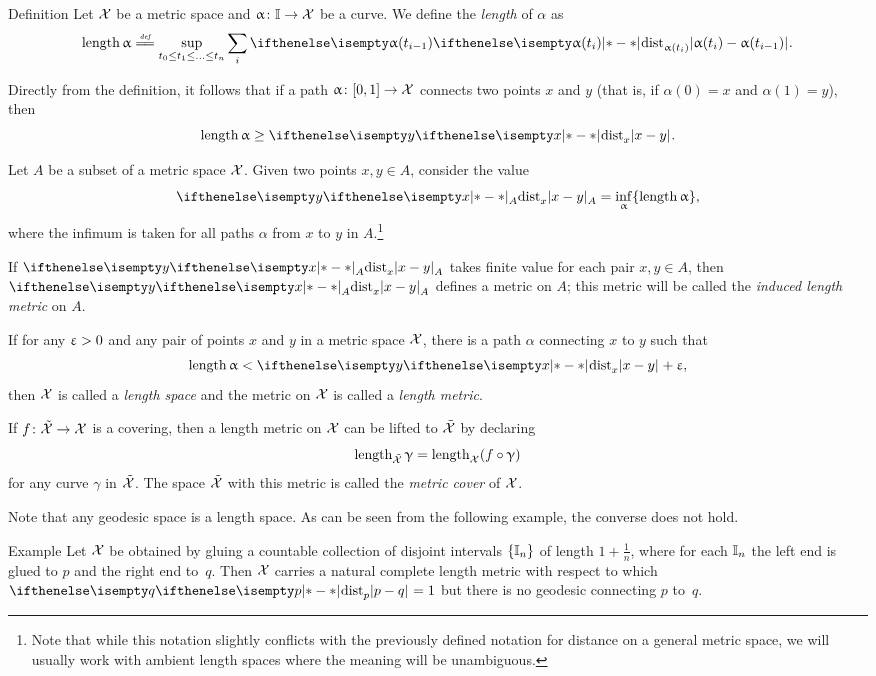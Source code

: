 \begin{thm}{Definition}
Let $\mathcal{X}$ be a metric space and
$\alpha\: \II\to \spc{X}$ be a curve.
We define the \emph{length} of $\alpha$ as 
\[
\length \alpha \df \sup_{t_0\le t_1\le\ldots\le t_n}\sum_i \dist{\alpha(t_i)}{\alpha(t_{i-1})}{}.
\]
\end{thm}

Directly from the definition, it follows that if a path $\alpha\:[0,1]\to\spc{X}$ connects two points $x$ and $y$ 
(that is, if $\alpha(0)=x$ and $\alpha(1)=y$), then 
\[\length\alpha\ge \dist{x}{y}{}.\]

Let $A$ be a subset of a metric space $\mathcal{X}$.
Given two points $x,y\in A$,
consider the value
\[\dist{x}{y}{A}=\inf_{\alpha}\{\length\alpha\},\]
where the infimum is taken for all paths $\alpha$ from $x$ to $y$ in $A$.\footnote{Note that while this notation slightly conflicts with the previously defined notation for distance on a general metric space, we will usually work with ambient length spaces where the meaning will be unambiguous.}

If $\dist{x}{y}{A}$ takes finite value for each pair $x,y\in A$,
then $\dist{x}{y}{A}$ defines a metric on  $A$;
this metric will be called the \emph{induced length metric} on $A$.

If for any $\upvarepsilon>0$ and any pair of points $x$ and $y$ in a metric space $\mathcal{X}$, there is a path $\alpha$ connecting $x$ to $y$ such that
\[\length\alpha< \dist{x}{y}{}+\eps,\]
then $\mathcal{X}$ is called a \emph{length space} and the metric on $\mathcal{X}$ is called a \emph{length metric}.\label{page:length metric}

If $f\:\~{\spc{X}}\to\spc{X}$ is a covering,
then a length metric on $\mathcal{X}$ can be lifted to $\tilde{\mathcal{X}}$
by declaring 
\[\length_{\~{\spc{X}}}\gamma=\length_{\spc{X}}(f\circ\gamma)\]
for any curve $\gamma$ in $\tilde{\mathcal{X}}$.
The space $\tilde{\mathcal{X}}$ with this metric is called the  \emph{metric cover} of $\mathcal{X}$.

Note that any geodesic space is a length space.
As can be seen from the following example, the converse does not hold.


\begin{thm}{Example}
Let $\mathcal{X}$ be obtained by gluing a countable collection of disjoint intervals $\{\mathbb{I}_n\}$ of length $1+\tfrac1n$, where for each $\mathbb{I}_n$ the left end is glued to $p$ and the right end to~$q$.
Then $\mathcal{X}$ carries a natural complete length metric with respect to which $\dist{p}{q}{}=1$ but there is no geodesic connecting $p$ to~$q$.
\end{thm}



